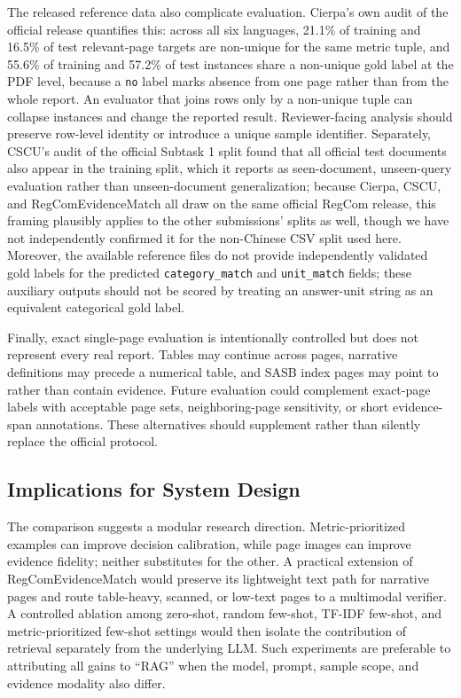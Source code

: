 \documentclass[sigconf,article]{acmart}
\newcommand{\RegComEvidenceMatch}{RegCom\-Evidence\-Match}
\begin{document}
The released reference data also complicate evaluation. Cierpa's own audit of the official release quantifies this: across all six languages, 21.1\% of training and 16.5\% of test relevant-page targets are non-unique for the same metric tuple, and 55.6\% of training and 57.2\% of test instances share a non-unique gold label at the PDF level, because a \texttt{no} label marks absence from one page rather than from the whole report. An evaluator that joins rows only by a non-unique tuple can collapse instances and change the reported result. Reviewer-facing analysis should preserve row-level identity or introduce a unique sample identifier. Separately, CSCU's audit of the official Subtask 1 split found that all official test documents also appear in the training split, which it reports as seen-document, unseen-query evaluation rather than unseen-document generalization; because Cierpa, CSCU, and \RegComEvidenceMatch{} all draw on the same official RegCom release, this framing plausibly applies to the other submissions' splits as well, though we have not independently confirmed it for the non-Chinese CSV split used here. Moreover, the available reference files do not provide independently validated gold labels for the predicted \texttt{category\_match} and \texttt{unit\_match} fields; these auxiliary outputs should not be scored by treating an answer-unit string as an equivalent categorical gold label.

Finally, exact single-page evaluation is intentionally controlled but does not represent every real report. Tables may continue across pages, narrative definitions may precede a numerical table, and SASB index pages may point to rather than contain evidence. Future evaluation could complement exact-page labels with acceptable page sets, neighboring-page sensitivity, or short evidence-span annotations. These alternatives should supplement rather than silently replace the official protocol.

\subsection{Implications for System Design}
The comparison suggests a modular research direction. Metric-prioritized examples can improve decision calibration, while page images can improve evidence fidelity; neither substitutes for the other. A practical extension of \RegComEvidenceMatch{} would preserve its lightweight text path for narrative pages and route table-heavy, scanned, or low-text pages to a multimodal verifier. A controlled ablation among zero-shot, random few-shot, TF-IDF few-shot, and metric-prioritized few-shot settings would then isolate the contribution of retrieval separately from the underlying LLM. Such experiments are preferable to attributing all gains to ``RAG'' when the model, prompt, sample scope, and evidence modality also differ.
\end{document}
